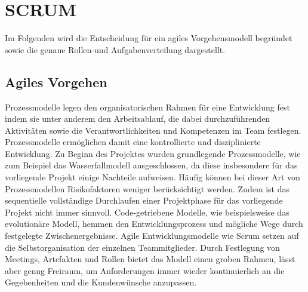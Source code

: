 \section{SCRUM}
Im Folgenden wird die Entscheidung für ein agiles Vorgehensmodell begründet sowie die genaue Rollen-und Aufgabenverteilung dargestellt.

\subsection{Agiles Vorgehen}
Prozessmodelle legen den organisatorischen Rahmen für eine Entwicklung fest indem sie unter anderem den Arbeitsablauf, die dabei durchzuführenden Aktivitäten sowie die Verantwortlichkeiten und Kompetenzen im Team festlegen. \cite{amberg2011wertschopfungsorientierte} Prozessmodelle ermöglichen damit eine kontrollierte und disziplinierte Entwicklung. \cite{amberg2011wertschopfungsorientierte} Zu Beginn des Projektes wurden grundlegende Prozessmodelle, wie zum Beispiel das Wasserfallmodell ausgeschlossen, da diese insbesondere für das vorliegende Projekt einige Nachteile aufweisen. Häufig können bei dieser Art von Prozessmodellen Risikofaktoren weniger berücksichtigt werden. Zudem ist das sequentielle vollständige Durchlaufen einer Projektphase für das vorliegende Projekt nicht immer sinnvoll. \cite{amberg2011wertschopfungsorientierte} Code-getriebene Modelle, wie beispielsweise das evolutionäre Modell, hemmen den Entwicklungsprozess und mögliche Wege durch festgelegte Zwischenergebnisse. \cite{amberg2011wertschopfungsorientierte, balzert2000lehrbuch} Agile Entwicklungsmodelle wie Scrum setzen auf die Selbstorganisation der einzelnen Teammitglieder. \cite{scrum} Durch Festlegung von Meetings, Artefakten und Rollen bietet das Modell einen groben Rahmen, lässt aber genug Freiraum, um Anforderungen immer wieder kontinuierlich an die Gegebenheiten und die Kundenwünsche anzupassen.
